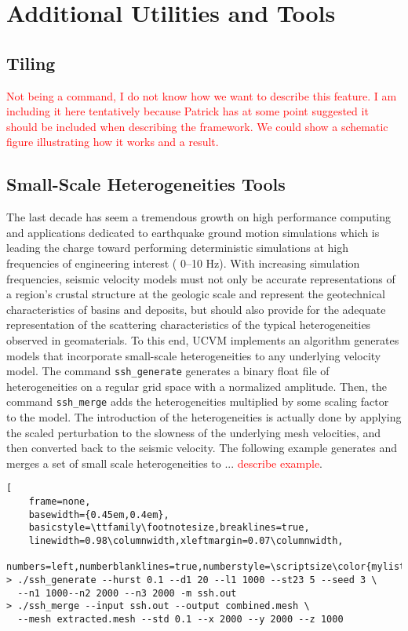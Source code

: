 
\section{Additional Utilities and Tools}
\label{sec:utilities}

\subsection{Tiling}

\textcolor{red}{Not being a command, I do not know how we want to describe this feature. I am including it here tentatively because Patrick has at some point suggested it should be included when describing the framework. We could show a schematic figure illustrating how it works and a result.}

\subsection{Small-Scale Heterogeneities Tools}

The last decade has seem a tremendous growth on high performance computing and applications dedicated to earthquake ground motion simulations which is leading the charge toward performing deterministic simulations at high frequencies of engineering interest (\fmax{} 0--10 Hz). With increasing simulation frequencies, seismic velocity models must not only be accurate representations of a region's crustal structure at the geologic scale and represent the geotechnical characteristics of basins and deposits, but should also provide for the adequate representation of the scattering characteristics of the typical heterogeneities observed in geomaterials. To this end, UCVM implements an algorithm generates models that incorporate small-scale heterogeneities to any underlying velocity model. The command \texttt{ssh\_generate} generates a binary float file of heterogeneities on a regular grid space with a normalized amplitude. Then, the command \texttt{ssh\_merge} adds the heterogeneities multiplied by some scaling factor to the model. The introduction of the heterogeneities is actually done by applying the scaled perturbation to the slowness of the underlying mesh velocities, and then converted back to the seismic velocity. The following example generates and merges a set of small scale heterogeneities to ... \textcolor{red}{describe example}. 

\begin{lstlisting}[
	frame=none,
	basewidth={0.45em,0.4em},
	basicstyle=\ttfamily\footnotesize,breaklines=true,
	linewidth=0.98\columnwidth,xleftmargin=0.07\columnwidth,
	numbers=left,numberblanklines=true,numberstyle=\scriptsize\color{mylistingnclr}]
> ./ssh_generate --hurst 0.1 --d1 20 --l1 1000 --st23 5 --seed 3 \
  --n1 1000--n2 2000 --n3 2000 -m ssh.out
> ./ssh_merge --input ssh.out --output combined.mesh \
  --mesh extracted.mesh --std 0.1 --x 2000 --y 2000 --z 1000
\end{lstlisting}

